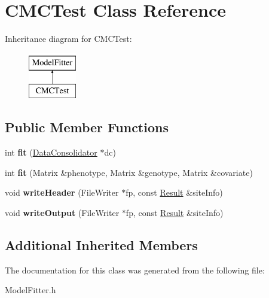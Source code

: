 \hypertarget{classCMCTest}{\section{C\-M\-C\-Test Class Reference}
\label{classCMCTest}
}
Inheritance diagram for C\-M\-C\-Test\-:\begin{figure}[H]
\begin{center}
\leavevmode
\includegraphics[height=2.000000cm]{classCMCTest}
\end{center}
\end{figure}
\subsection*{Public Member Functions}
\begin{DoxyCompactItemize}
\item 
\hypertarget{classCMCTest_a47dc595db594a6f41ae4439aca3a52fa}{int {\bfseries fit} (\hyperlink{classDataConsolidator}{Data\-Consolidator} $\ast$dc)}\label{classCMCTest_a47dc595db594a6f41ae4439aca3a52fa}

\item 
\hypertarget{classCMCTest_a97a90ee4797437bafd0465b9e41373b9}{int {\bfseries fit} (Matrix \&phenotype, Matrix \&genotype, Matrix \&covariate)}\label{classCMCTest_a97a90ee4797437bafd0465b9e41373b9}

\item 
\hypertarget{classCMCTest_a555a77c763b13a8320db7aeee772f6d0}{void {\bfseries write\-Header} (File\-Writer $\ast$fp, const \hyperlink{classResult}{Result} \&site\-Info)}\label{classCMCTest_a555a77c763b13a8320db7aeee772f6d0}

\item 
\hypertarget{classCMCTest_a82db3ff3f259352ce73774974ea00d59}{void {\bfseries write\-Output} (File\-Writer $\ast$fp, const \hyperlink{classResult}{Result} \&site\-Info)}\label{classCMCTest_a82db3ff3f259352ce73774974ea00d59}

\end{DoxyCompactItemize}
\subsection*{Additional Inherited Members}


The documentation for this class was generated from the following file\-:\begin{DoxyCompactItemize}
\item 
Model\-Fitter.\-h\end{DoxyCompactItemize}

